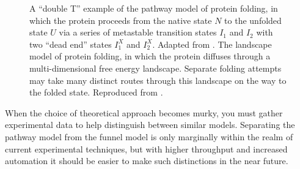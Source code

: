 \begin{figure}
  \begin{center}
  \caption{\protect{} A ``double T'' example
    of the pathway model of protein folding, in which the protein
    proceeds from the native state $N$ to the unfolded state $U$ via a
    series of metastable transition states $I_1$ and $I_2$ with two
    ``dead end'' states $I_1^X$ and $I_2^X$.  Adapted from
    \citet{bedard08}.
    \protect{} The landscape model of
    protein folding, in which the protein diffuses through a
    multi-dimensional free energy landscape.  Separate folding
    attempts may take many distinct routes through this landscape on
    the way to the folded state.  Reproduced from
    \citet{dill97}.\label{fig:folding}}
  \end{center}
\end{figure}

When the choice of theoretical approach becomes murky, you must gather
experimental data to help distinguish between similar models.
Separating the pathway model from the funnel model is only marginally
within the realm of current experimental techniques, but with higher
throughput and increased automation it should be easier to make such
distinctions in the near future.


